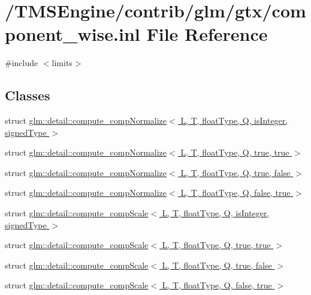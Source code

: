 \hypertarget{component__wise_8inl}{}\section{/\+T\+M\+S\+Engine/contrib/glm/gtx/component\+\_\+wise.inl File Reference}
\label{component__wise_8inl}
{\ttfamily \#include $<$limits$>$}\newline
\subsection*{Classes}
\begin{DoxyCompactItemize}
\item 
struct \hyperlink{structglm_1_1detail_1_1compute__comp_normalize}{glm\+::detail\+::compute\+\_\+comp\+Normalize$<$ L, T, float\+Type, Q, is\+Integer, signed\+Type $>$}
\item 
struct \hyperlink{structglm_1_1detail_1_1compute__comp_normalize_3_01_l_00_01_t_00_01float_type_00_01_q_00_01true_00_01true_01_4}{glm\+::detail\+::compute\+\_\+comp\+Normalize$<$ L, T, float\+Type, Q, true, true $>$}
\item 
struct \hyperlink{structglm_1_1detail_1_1compute__comp_normalize_3_01_l_00_01_t_00_01float_type_00_01_q_00_01true_00_01false_01_4}{glm\+::detail\+::compute\+\_\+comp\+Normalize$<$ L, T, float\+Type, Q, true, false $>$}
\item 
struct \hyperlink{structglm_1_1detail_1_1compute__comp_normalize_3_01_l_00_01_t_00_01float_type_00_01_q_00_01false_00_01true_01_4}{glm\+::detail\+::compute\+\_\+comp\+Normalize$<$ L, T, float\+Type, Q, false, true $>$}
\item 
struct \hyperlink{structglm_1_1detail_1_1compute__comp_scale}{glm\+::detail\+::compute\+\_\+comp\+Scale$<$ L, T, float\+Type, Q, is\+Integer, signed\+Type $>$}
\item 
struct \hyperlink{structglm_1_1detail_1_1compute__comp_scale_3_01_l_00_01_t_00_01float_type_00_01_q_00_01true_00_01true_01_4}{glm\+::detail\+::compute\+\_\+comp\+Scale$<$ L, T, float\+Type, Q, true, true $>$}
\item 
struct \hyperlink{structglm_1_1detail_1_1compute__comp_scale_3_01_l_00_01_t_00_01float_type_00_01_q_00_01true_00_01false_01_4}{glm\+::detail\+::compute\+\_\+comp\+Scale$<$ L, T, float\+Type, Q, true, false $>$}
\item 
struct \hyperlink{structglm_1_1detail_1_1compute__comp_scale_3_01_l_00_01_t_00_01float_type_00_01_q_00_01false_00_01true_01_4}{glm\+::detail\+::compute\+\_\+comp\+Scale$<$ L, T, float\+Type, Q, false, true $>$}
\end{DoxyCompactItemize}
